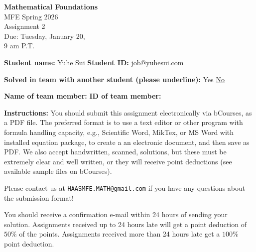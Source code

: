 \documentclass{article}
\begin{document}
\begin{center}

\textbf{Mathematical Foundations} \\

MFE Spring 2026 \\

Assignment 2 \\

Due: Tuesday, January 20, \\

9 am P.T.

\end{center}

\vspace{1em}

\noindent \textbf{Student name:} Yuhe Sui \hspace{3.54cm} \textbf{Student ID:} job@yuhesui.com

\vspace{1em}

\noindent \textbf{Solved in team with another student (please underline):} \hspace{1cm} Yes \hspace{1cm} \underline{No}

\vspace{1em}

\noindent \textbf{Name of team member:} \hspace{3cm} \textbf{ID of team member:}

\vspace{1em}

\noindent \textbf{Instructions:} You should submit this assignment electronically via bCourses, as a PDF file. The preferred format is to use a text editor or other program with formula handling capacity, e.g., Scientific Word, MikTex, or MS Word with installed equation package, to create a an electronic document, and then save as PDF. We also accept handwritten, scanned, solutions, but these must be extremely clear and well written, or they will receive point deductions (see available sample files on bCourses).

\vspace{1em}

\noindent Please contact us at \texttt{HAASMFE.MATH@gmail.com} if you have any questions about the submission format!

\vspace{1em}

\noindent You should receive a confirmation e-mail within 24 hours of sending your solution. Assignments received up to 24 hours late will get a point deduction of $50\%$ of the points. Assignments received more than 24 hours late get a $100\%$ point deduction.
\end{document}
